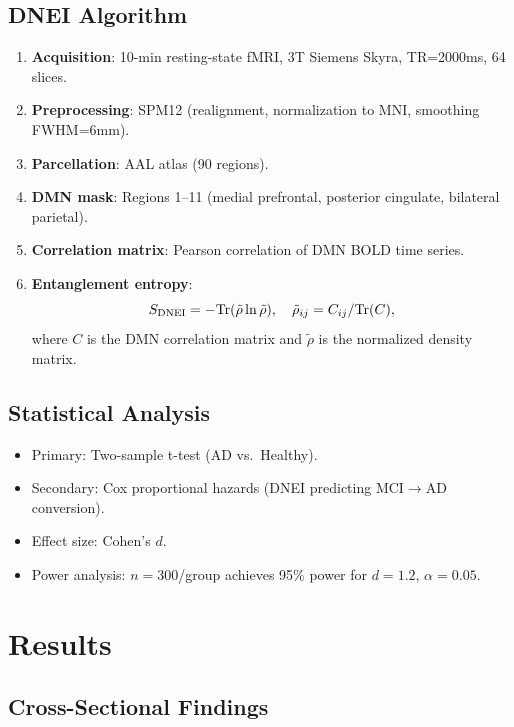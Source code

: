 \documentclass[12pt]{article}
\begin{document}
\subsection{DNEI Algorithm}

\begin{enumerate}
\item \textbf{Acquisition}: 10-min resting-state fMRI, 3T Siemens Skyra, TR=2000ms, 64 slices.
\item \textbf{Preprocessing}: SPM12 (realignment, normalization to MNI, smoothing FWHM=6mm).
\item \textbf{Parcellation}: AAL atlas (90 regions).
\item \textbf{DMN mask}: Regions 1--11 (medial prefrontal, posterior cingulate, bilateral parietal).
\item \textbf{Correlation matrix}: Pearson correlation of DMN BOLD time series.
\item \textbf{Entanglement entropy}:
\begin{equation}
S_{\rm DNEI} = -\mathrm{Tr}(\tilde{\rho} \ln \tilde{\rho}), \quad \tilde{\rho}_{ij} = C_{ij}/\mathrm{Tr}(C),
\end{equation}
where $C$ is the DMN correlation matrix and $\tilde{\rho}$ is the normalized density matrix.
\end{enumerate}

\subsection{Statistical Analysis}
\begin{itemize}
\item Primary: Two-sample t-test (AD vs.\ Healthy).
\item Secondary: Cox proportional hazards (DNEI predicting MCI$\to$AD conversion).
\item Effect size: Cohen's $d$.
\item Power analysis: $n = 300$/group achieves 95\% power for $d = 1.2$, $\alpha = 0.05$.
\end{itemize}

\section{Results}
\label{sec:results}

\subsection{Cross-Sectional Findings}
\end{document}
